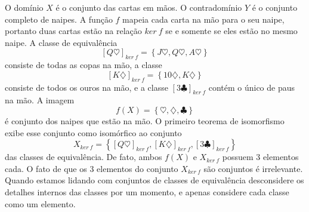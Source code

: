          O domínio $X$ é o conjunto das cartas em mãos. O contradomínio $Y$ é o conjunto completo de naipes. A função $f$ mapeia cada carta na mão para o seu naipe, portanto duas cartas estão na relação $ker\ f$ se e somente se eles estão no mesmo naipe. A classe de equivalência $$ \left[Q\heartsuit\right]_{ker\ f} = \left\{J\heartsuit , Q\heartsuit , A\heartsuit \right\}$$ consiste de todas as copas na mão, a classe $$\left[K\diamondsuit \right]_{ker\ f} = \left\{10\diamondsuit , K\diamondsuit \right\}$$ consiste de todos os ouros na mão, e a classe $\left[3\clubsuit \right]_{ker\ f}$ contém o único de paus na mão. A imagem $$f(X) = \left\{\heartsuit , \diamondsuit , \clubsuit  \right\}$$ é conjunto dos naipes que estão na mão. O primeiro teorema de isomorfismo exibe esse conjunto como isomórfico ao conjunto $$X_{ker\ f} = \left\{\left[Q\heartsuit\right]_{ker\ f}, \left[K\diamondsuit\right]_{ker\ f}, \left[3\clubsuit\right]_{ker\ f}\right\}$$ das classes de equivalência. De fato, ambos $f(X)$ e $X_{ker\ f}$ possuem 3 elementos cada. O fato de que os 3 elementos do conjunto $X_{ker\ f}$ são conjuntos é irrelevante. Quando estamos lidando com conjuntos de classes de equivalência desconsidere os detalhes internos das classes por um momento, e apenas considere cada classe como um elemento.


